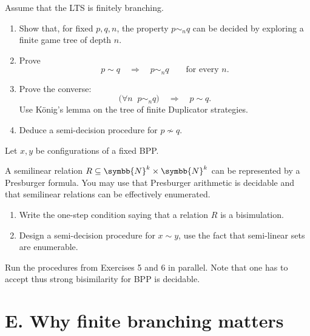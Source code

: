 \documentclass[11pt,a4paper,lmodern]{tutorial}
\DeclareRobustCommand{\N}{\symbb{N}}
\DeclareRobustCommand{\N}{\mathbb{N}}
\begin{document}
\begin{exercise}
Assume that the LTS is finitely branching.

\begin{enumerate}[label=(\alph*)]
\item Show that, for fixed $p,q,n$, the property $p\sim_n q$ can be decided
      by exploring a finite game tree of depth $n$.
\item Prove
      \[
           p\sim q \quad\Longrightarrow\quad
           p\sim_n q\qquad\text{for every }n.
      \]
\item Prove the converse:
      \[
           \bigl(\forall n\;\; p\sim_n q\bigr)
           \quad\Longrightarrow\quad
           p\sim q.
      \]
      Use K\"onig's lemma on the tree of finite Duplicator strategies.
\item Deduce a semi-decision procedure for $p\not\sim q$.
\end{enumerate}
\end{exercise}

\begin{exercise}
Let $x,y$ be configurations of a fixed BPP.

A semilinear relation $R\subseteq\N^k\times\N^k$ can be represented by a
Presburger formula.  You may use that Presburger arithmetic is decidable
and that semilinear relations can be effectively enumerated.

\begin{enumerate}[label=(\alph*)]
\item Write the one-step condition saying that a relation $R$ is a
      bisimulation.
\item Design a semi-decision procedure for $x\sim y$, use the fact that semi-linear sets are enumerable.
\end{enumerate}
\remark
Run the procedures from Exercises 5 and 6 in parallel.
Note that one has to accept thus strong bisimilarity for BPP is decidable.
\end{exercise}


\section*{E. Why finite branching matters}
\end{document}
